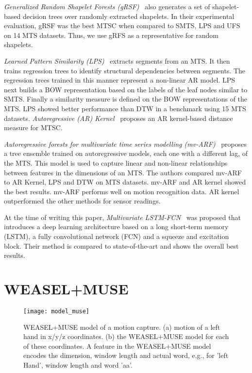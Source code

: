 \documentclass[sigconf]{acmart}
\begin{document}
\emph{Generalized Random Shapelet Forests (gRSF)}~\cite{karlsson2016generalized} also generates a set of shapelet-based decision trees over randomly extracted shapelets. In their experimental evaluation, gRSF was the best MTSC when compared to SMTS, LPS and UFS on 14 MTS datasets. Thus, we use gRFS as a representative for random shapelets.

\emph{Learned Pattern Similarity (LPS)}~\cite{baydogan2016time} extracts segments from an MTS. It then trains regression trees to identify structural dependencies between segments. The regression trees trained in this	manner represent a non-linear AR model. LPS next builds a BOW representation based on the labels of the leaf nodes similar to SMTS. Finally a similarity measure is defined on the BOW representations of the MTS. LPS showed better performance than DTW in a benchmark using 15 MTS datasets.
\emph{Autoregressive (AR) Kernel}~\cite{cuturi2011autoregressive} proposes an AR kernel-based distance measure for MTSC.

\emph{Autoregressive forests for multivariate time series modelling (mv-ARF)}~\cite{tuncel2018autoregressive} proposes a tree ensemble trained on autoregressive models, each one with a different lag, of the MTS. 
This model is used to capture linear and non-linear relationships between features in the dimensions of an MTS.
The authors compared mv-ARF to AR Kernel, LPS and DTW on  MTS datasets. mv-ARF and AR kernel showed the best results. mv-ARF performs well on motion recognition data. AR kernel outperformed the other methods for sensor readings.

At the time of writing this paper, \emph{Multivariate LSTM-FCN}~\cite{karim2018multivariate} was proposed that introduces a deep learning architecture based on a long short-term memory  (LSTM), a fully convolutional network (FCN) and a squeeze and excitation block. Their method is compared to state-of-the-art and shows the overall best results. 






\section{WEASEL+MUSE}\label{sec:TSCMUSE}

\begin{figure*}
	\texttt{[image: model\_muse]}
	\caption{WEASEL+MUSE model of a motion capture. (a) motion of a left hand in x/y/z coordinates. (b) the WEASEL+MUSE model for each of these coordinates. A feature in the WEASEL+MUSE model encodes the dimension, window length and actual word, e.g.,  for 'left Hand', window length  and word 'aa'.\label{fig:MUSE-Model}}
\end{figure*}
\end{document}
